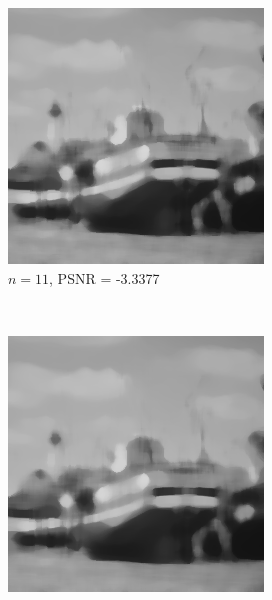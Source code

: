 \documentclass{article}
\begin{document}
\begin{enumerate}[label=(\alph*)]
\begin{figure}[!htb]
        \begin{subfigure}[b]{0.3\textwidth}
            \includegraphics[width=\textwidth]{img/RS11.png}
            \caption{$n = 11$, PSNR = -3.3377}
        \end{subfigure}
        ~
        \begin{subfigure}[b]{0.3\textwidth}
            \includegraphics[width=\textwidth]{img/RS13.png}

\end{subfigure}
\end{figure}
\end{enumerate}
\end{document}
